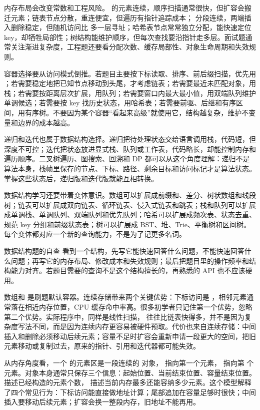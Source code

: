 内存布局会改变常数和工程风险。  的元素连续，顺序扫描通常很快，但扩容会搬迁元素；链表节点分散，重连便宜，但遍历有指针追踪成本； 分段连续，两端插入删除稳定，但随机访问比  多一层寻址；哈希表节点常常独立分配，能快速定位 key，却牺牲局部性；树结构能维护顺序，但每次查找要沿指针走多层。面试题通常关注渐进复杂度，工程题还要看分配次数、缓存局部性、对象生命周期和失效规则。

容器选择要从访问模式倒推。若题目主要按下标读取、排序、前后缀扫描，优先用 ；若需要稳定地把已知节点移动到头尾，才考虑链表；若需要最近未匹配对象，用栈；若需要按距离层次扩展，用队列；若需要窗口内最大最小值，用双端队列维护单调候选；若需要按 key 找历史状态，用哈希表；若需要前驱、后继和有序区间，用有序树。不要因为某个容器“看起来高级”就使用它，结构越复杂，维护不变量和边界的成本越高。

递归和迭代也属于数据结构选择。递归把待处理状态交给语言调用栈，代码短，但深度不可控；迭代把状态放进显式栈、队列或工作表，代码略长，却能控制内存和遍历顺序。二叉树遍历、图搜索、回溯和 DP 都可以从这个角度理解：递归不是算法本身，栈帧里保存的节点、下标、路径、剩余目标和访问标记才是算法状态。掌握这些状态后，递归版和迭代版就能互相转换。

数据结构学习还要带着变体意识。数组可以扩展成前缀和、差分、树状数组和线段树；链表可以扩展成双向链表、循环链表、侵入式链表和跳表；栈和队列可以扩展成单调栈、单调队列、双端队列和优先队列；哈希可以扩展成频次表、状态去重、规范 key 分组和前缀状态表；树可以扩展成 BST、堆、Trie、平衡树和区间树。每个变体都对应一个新的查询能力，不是为了记更多名词。

\begin{principlebox}{数据结构题的自查}
看到一个结构，先写它能快速回答什么问题，不能快速回答什么问题；再写它的内存布局、修改成本和失效规则；最后把题目里的操作频率和结构能力对齐。若题目需要的查询不是这个结构擅长的，再熟悉的 API 也不应该硬用。
\end{principlebox}

数组和  是刷题默认容器。连续存储带来两个关键优势：下标访问是 ，相邻元素通常落在相近内存位置，CPU 缓存命中率高。很多初学者只记住第一个优势，忽略第二个优势。实际程序中，同样是线性扫描， 往往比链表快得多，并不是因为复杂度写法不同，而是因为连续内存更容易被硬件预取。代价也来自连续存储：中间插入和删除必须移动后续元素；容量不足时扩容会重新申请一段更大的空间，把旧元素移动或复制过去，原来的指针、引用和迭代器都可能失效。

从内存角度看，一个  的元素区是一段连续的  对象， 指向第一个元素， 指向第  个元素。对象本身通常只保存三个信息：起始位置、当前结束位置、容量结束位置。  描述已经构造的元素个数， 描述当前内存最多还能容纳多少元素。这个模型解释了四个常见行为：下标访问能直接做地址计算；尾部追加在容量足够时很快；中间插入要移动后续元素；扩容会换一整段内存，旧地址不能再用。

